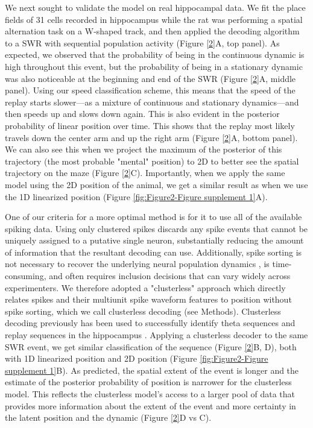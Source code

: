 \documentclass[times, twoside]{zHenriquesLab-StyleBioRxiv}
\begin{document}
We next sought to validate the model on real hippocampal data. We fit the place fields of 31 cells recorded in hippocampus while the rat was performing a spatial alternation task on a W-shaped track, and then applied the decoding algorithm to a SWR with sequential population activity (Figure \ref{2}A, top panel). As expected, we observed that the probability of being in the continuous dynamic is high throughout this event, but the probability of being in a stationary dynamic was also noticeable at the beginning and end of the SWR (Figure \ref{2}A, middle panel). Using our speed classification scheme, this means that the speed of the replay starts slower---as a mixture of continuous and stationary dynamics---and then speeds up and slows down again. This is also evident in the posterior probability of linear position over time. This shows that the replay most likely travels down the center arm and up the right arm (Figure \ref{2}A, bottom panel). We can also see this when we project the maximum of the posterior of this trajectory (the most probable "mental" position) to 2D to better see the spatial trajectory on the maze (Figure \ref{2}C). Importantly, when we apply the same model using the 2D position of the animal, we get a similar result as when we use the 1D linearized position (Figure \ref{fig:Figure2-Figure supplement 1}A).

One of our criteria for a more optimal method is for it to use all of the available spiking data. Using only clustered spikes discards any spike events that cannot be uniquely assigned to a putative single neuron, substantially reducing the amount of information that the resultant decoding can use. Additionally, spike sorting is not necessary to recover the underlying neural population dynamics \cite{TrautmannAccurateEstimationNeural2019}, is time-consuming, and often requires inclusion decisions that can vary widely across experimenters. We therefore adopted a "clusterless" approach which directly relates spikes and their multiunit spike waveform features to position without spike sorting, which we call clusterless decoding (see Methods). Clusterless decoding previously has been used to successfully identify theta sequences and replay sequences in the hippocampus \cite{KloostermanBayesiandecodingusing2014, ChenTransductiveneuraldecoding2012,DengRapidclassificationhippocampal2016, KayConstantSubsecondCycling2020}. Applying a clusterless decoder to the same SWR event, we get similar classification of the sequence (Figure \ref{2}B, D), both with 1D linearized position and 2D position (Figure \ref{fig:Figure2-Figure supplement 1}B). As predicted, the spatial extent of the event is longer and the estimate of the posterior probability of position is narrower for the clusterless model. This reflects the clusterless model's access to a larger pool of data that provides more information about the extent of the event and more certainty in the latent position and the dynamic (Figure \ref{2}D vs C).
\end{document}
